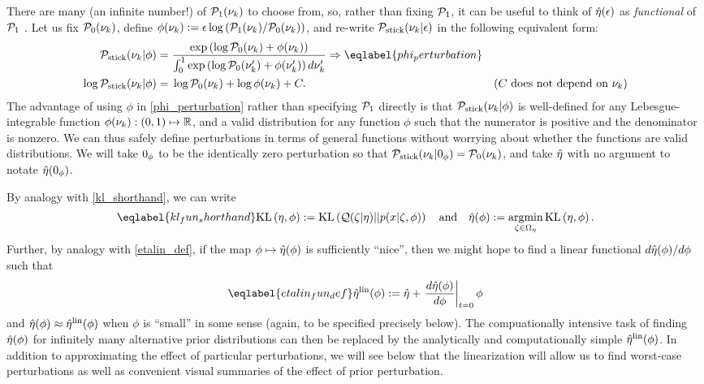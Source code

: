 There are many (an infinite number!) of $\mathcal{P}_{1}(\nu_{k})$ to choose from, so, rather
than fixing $\mathcal{P}_{1}$, it can be useful to think of $\hat\eta(\epsilon)$ as {\em
functional} of $\mathcal{P}_{1}$ \citep{gustafson:1996:local}.  Let us fix $\mathcal{P}_{0}(\nu_{k})$,
define $\phi(\nu_{k}) := \epsilon \log \left(\mathcal{P}_{1}(\nu_{k}) / \mathcal{P}_{0}(\nu_{k})\right)$,
and re-write $\mathcal{P}_{\mathrm{stick}}(\nu_{k} \vert \epsilon)$ in the following equivalent form:
%
\begin{align}
%
\pstick(\nuk \vert \phi) ={}&
\frac{\exp\left(\log \pbase(\nuk) + \phi(\nuk)\right)}
     {\int_0^1 \exp\left(\log \pbase(\nuk') + \phi(\nuk')\right) d\nuk'}
        \Rightarrow \eqlabel{phi_perturbation}\\
\log \pstick(\nuk \vert \phi) ={}&
    \log \pbase(\nuk) + \log \phi(\nuk) + \const.
    & \constdesc{\nuk} \nonumber
%
\end{align}
%
The advantage of using $\phi$ in \eqref{phi_perturbation} rather than specifying
$\mathcal{P}_{1}$ directly is that $\mathcal{P}_{\mathrm{stick}}(\nu_{k} \vert \phi)$ is well-defined for any
Lebesgue-integrable function $\phi(\nu_{k}): (0,1)\mapsto\mathbb{R}$, and a valid
distribution for any function $\phi$ such that the numerator is positive and the
denominator is nonzero.  We can thus safely define perturbations in terms of
general functions without worrying about whether the functions are valid
distributions. We will take $0_\phi$ to be the identically zero perturbation so
that $\mathcal{P}_{\mathrm{stick}}(\nu_{k} \vert 0_\phi) = \mathcal{P}_{0}(\nu_{k})$, and take $\hat\eta$ with no
argument to notate $\hat\eta(0_\phi)$.

By analogy with \eqref{kl_shorthand}, we can write
%
\begin{align}\eqlabel{kl_fun_shorthand}
%
\KL{\eta, \phi} := \KL{\q(\zeta \vert \eta) || p(\x \vert \zeta, \phi)}
\mathand
\etaopt(\phi) := \argmin_{\zeta \in \etadom} \KL{\eta, \phi}.
%
\end{align}
%
Further, by analogy with \eqref{etalin_def}, if the map $\phi \mapsto
\hat\eta(\phi)$ is sufficiently ``nice'', then we might hope to find a linear
functional $d\hat\eta(\phi) / d\phi$ such that
%
\begin{align}\eqlabel{etalin_fun_def}
%
\etalin(\phi) := \etaopt + \fracat{d \etaopt(\phi)}{d \phi}{\t=0} \phi
%
\end{align}
%
and $\hat\eta(\phi) \approx \hat\eta^{\mathrm{lin}}(\phi)$ when $\phi$ is ``small'' in some sense
(again, to be specified precisely below).  The compuationally intensive task of
finding $\hat\eta(\phi)$ for infinitely many alternative prior distributions can
then be replaced by the analytically and computationally simple $\hat\eta^{\mathrm{lin}}(\phi)$.
In addition to approximating the effect of particular perturbations, we will see
below that the linearization will allow us to find worst-case perturbations as
well as convenient visual summaries of the effect of prior perturbation.

